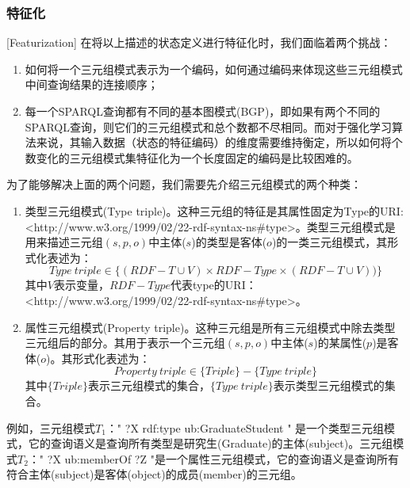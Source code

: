 \subsubsection{特征化}[Featurization]
在将以上描述的状态定义进行特征化时，我们面临着两个挑战：
\begin{enumerate}
    \item 如何将一个三元组模式表示为一个编码，如何通过编码来体现这些三元组模式中间查询结果的连接顺序；
    \item 每一个SPARQL查询都有不同的基本图模式(BGP)，即如果有两个不同的SPARQL查询，则它们的三元组模式和总个数都不尽相同。而对于强化学习算法来说，其输入数据（状态的特征编码）的维度需要维持衡定，所以如何将个数变化的三元组模式集特征化为一个长度固定的编码是比较困难的。
\end{enumerate}

为了能够解决上面的两个问题，我们需要先介绍三元组模式的两个种类：
\begin{enumerate}
    \item 类型三元组模式(Type triple)。这种三元组的特征是其属性固定为Type的URI: <http://www.w3.org/1999/02/22-rdf-syntax-ns\#type>。类型三元组模式是用来描述三元组$(s,p,o)$中主体($s$)的类型是客体($o$)的一类三元组模式，其形式化表述为：$$Type\ triple \in \lbrace (RDF-T \cup V)\times RDF-Type\times (RDF-T \cup V) ) \rbrace$$ 其中$V$表示变量，$RDF-Type$代表type的URI：<http://www.w3.org/1999/02/22-rdf-syntax-ns\#type>。
    \item 属性三元组模式(Property triple)。这种三元组是所有三元组模式中除去类型三元组后的部分。其用于表示一个三元组$(s,p,o)$中主体($s$)的某属性($p$)是客体($o$)。其形式化表述为：$$Property\ triple \in \lbrace Triple \rbrace - \lbrace Type\ triple \rbrace $$ 其中$\lbrace Triple \rbrace$表示三元组模式的集合，$\lbrace Type\ triple \rbrace$表示类型三元组模式的集合。
\end{enumerate}

例如，三元组模式$T_1$：" ?X rdf:type ub:GraduateStudent " 是一个类型三元组模式，它的查询语义是查询所有类型是研究生(Graduate)的主体(subject)。三元组模式$T_2$：" ?X ub:memberOf ?Z "是一个属性三元组模式，它的查询语义是查询所有符合主体(subject)是客体(object)的成员(member)的三元组。

